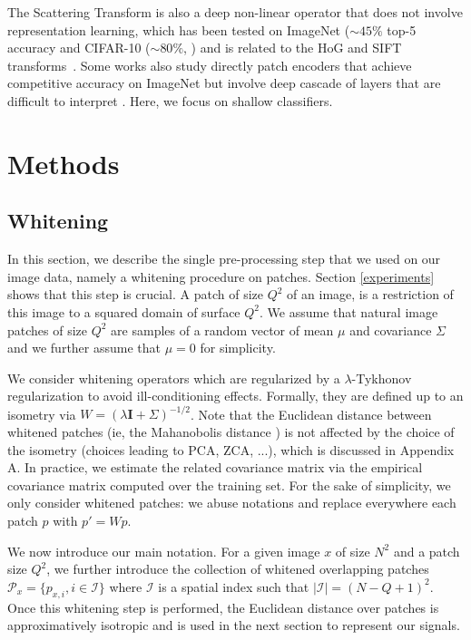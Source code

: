 \documentclass{article}
\newcommand{\Edouard}[1]{\textcolor{blue}{#1}}
\begin{document}
The Scattering Transform \citep{mallat2012group} is also a deep non-linear operator that does not involve representation learning, which has been tested on ImageNet ($\sim 45\%$ top-5 accuracy \citep{zarka2019deep} and  CIFAR-10 ($\sim 80 \%$, \citep{Oyallon_2015_CVPR}) and is related to the HoG and SIFT transforms~\citep{Oyallon_2018_ECCV}.
Some works also study directly patch encoders that achieve competitive accuracy on ImageNet but involve deep cascade of layers that are difficult to interpret \citep{oyallon2017scaling,zarka2019deep,brendel2019approximating}. Here, we focus on shallow classifiers. %

\section{Methods}
\label{method}

\subsection{Whitening}

In this section, we describe the single pre-processing step that we used on our image data, namely a whitening procedure on patches. Section \ref{experiments} shows that this step is crucial. A patch of size $Q^2$ of an image, is a  restriction of this image to a squared domain of surface $Q^2$.
We assume that natural image patches of size $Q^2$ are samples of a random vector of mean $\mu$ and covariance   $\Sigma$ and we further assume that $\mu = 0$ for simplicity.

We consider whitening operators which are regularized by a $\lambda$-Tykhonov regularization to avoid ill-conditioning effects.
Formally, they are defined up to an isometry via $W=(\lambda \mathbf{I}+\Sigma
)^{-1/2}$.  Note that the Euclidean distance between whitened patches (ie, the Mahanobolis distance \citep{chandra1936generalised}) is not affected by the choice of the isometry (choices leading to PCA, ZCA, ...), which is discussed in Appendix A. In practice, we estimate the related covariance matrix via the empirical covariance matrix computed over the training set. For the sake of simplicity, we  only  consider whitened patches: we  abuse notations and replace everywhere each patch $p$ with $p'=Wp$.
 
 
We now introduce our main notation. For a given image $x$ of size $N^2$ and a patch size $Q^2$, we further introduce the collection of whitened overlapping patches $\mathcal{P}_x=\{p_{x,i},i\in\mathcal{I}\}$ where $\mathcal{I}$ is a spatial index such that $|\mathcal{I}|=(N-Q+1)
^2$.
Once this whitening step is performed, the Euclidean distance over patches is approximatively isotropic and is used in the next section to represent our signals.
\end{document}
